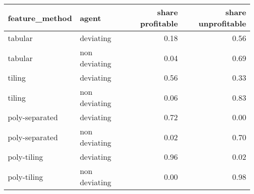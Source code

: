 \begin{tabular}{llrr}
  \hline
feature\_method & agent & share profitable & share unprofitable \\ 
  \hline
tabular & deviating & 0.18 & 0.56 \\ 
  tabular & non deviating & 0.04 & 0.69 \\ 
  tiling & deviating & 0.56 & 0.33 \\ 
  tiling & non deviating & 0.06 & 0.83 \\ 
  poly-separated & deviating & 0.72 & 0.00 \\ 
  poly-separated & non deviating & 0.02 & 0.70 \\ 
  poly-tiling & deviating & 0.96 & 0.02 \\ 
  poly-tiling & non deviating & 0.00 & 0.98 \\ 
   \hline
\end{tabular}
